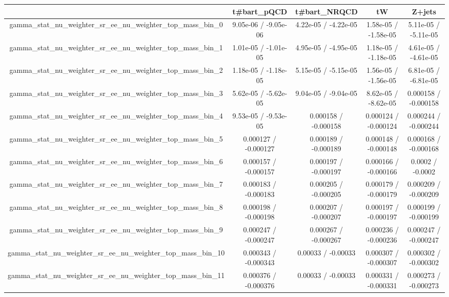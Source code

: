 \documentclass[10pt]{article}
\begin{document}
\begin{table}[htbp]
\begin{center}
\begin{tabular}{|c|c|c|c|c|}
\hline 
      & t#bar{t}_{pQCD}      & t#bar{t}_{NRQCD}      & tW      & Z+jets \\ 
\hline 
  gamma_stat_nu_weighter_sr_ee_nu_weighter_top_mass_bin_0 & 9.05e-06 / -9.05e-06 & 4.22e-05 / -4.22e-05 & 1.58e-05 / -1.58e-05 & 5.11e-05 / -5.11e-05 \\ 
  gamma_stat_nu_weighter_sr_ee_nu_weighter_top_mass_bin_1 & 1.01e-05 / -1.01e-05 & 4.95e-05 / -4.95e-05 & 1.18e-05 / -1.18e-05 & 4.61e-05 / -4.61e-05 \\ 
  gamma_stat_nu_weighter_sr_ee_nu_weighter_top_mass_bin_2 & 1.18e-05 / -1.18e-05 & 5.15e-05 / -5.15e-05 & 1.56e-05 / -1.56e-05 & 6.81e-05 / -6.81e-05 \\ 
  gamma_stat_nu_weighter_sr_ee_nu_weighter_top_mass_bin_3 & 5.62e-05 / -5.62e-05 & 9.04e-05 / -9.04e-05 & 8.62e-05 / -8.62e-05 & 0.000158 / -0.000158 \\ 
  gamma_stat_nu_weighter_sr_ee_nu_weighter_top_mass_bin_4 & 9.53e-05 / -9.53e-05 & 0.000158 / -0.000158 & 0.000124 / -0.000124 & 0.000244 / -0.000244 \\ 
  gamma_stat_nu_weighter_sr_ee_nu_weighter_top_mass_bin_5 & 0.000127 / -0.000127 & 0.000189 / -0.000189 & 0.000148 / -0.000148 & 0.000168 / -0.000168 \\ 
  gamma_stat_nu_weighter_sr_ee_nu_weighter_top_mass_bin_6 & 0.000157 / -0.000157 & 0.000197 / -0.000197 & 0.000166 / -0.000166 & 0.0002 / -0.0002 \\ 
  gamma_stat_nu_weighter_sr_ee_nu_weighter_top_mass_bin_7 & 0.000183 / -0.000183 & 0.000205 / -0.000205 & 0.000179 / -0.000179 & 0.000209 / -0.000209 \\ 
  gamma_stat_nu_weighter_sr_ee_nu_weighter_top_mass_bin_8 & 0.000198 / -0.000198 & 0.000207 / -0.000207 & 0.000197 / -0.000197 & 0.000199 / -0.000199 \\ 
  gamma_stat_nu_weighter_sr_ee_nu_weighter_top_mass_bin_9 & 0.000247 / -0.000247 & 0.000267 / -0.000267 & 0.000236 / -0.000236 & 0.000247 / -0.000247 \\ 
  gamma_stat_nu_weighter_sr_ee_nu_weighter_top_mass_bin_10 & 0.000343 / -0.000343 & 0.00033 / -0.00033 & 0.000307 / -0.000307 & 0.000302 / -0.000302 \\ 
  gamma_stat_nu_weighter_sr_ee_nu_weighter_top_mass_bin_11 & 0.000376 / -0.000376 & 0.00033 / -0.00033 & 0.000331 / -0.000331 & 0.000273 / -0.000273 \\ 

\end{tabular}
\end{center}
\end{table}
\end{document}
